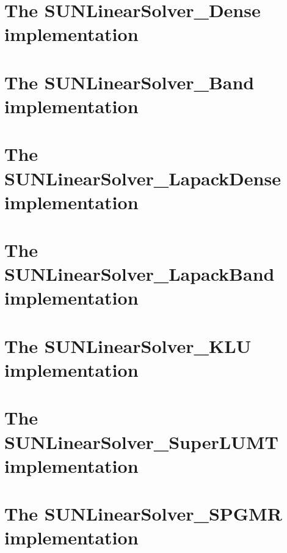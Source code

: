 \section{The SUNLinearSolver\_Dense implementation}\label{ss:sunlinsol_dense}


\section{The SUNLinearSolver\_Band implementation}\label{ss:sunlinsol_band}


\section{The SUNLinearSolver\_LapackDense implementation}\label{ss:sunlinsol_lapdense}


\section{The SUNLinearSolver\_LapackBand implementation}\label{ss:sunlinsol_lapband}


\section{The SUNLinearSolver\_KLU implementation}\label{ss:sunlinsol_klu}


\section{The SUNLinearSolver\_SuperLUMT implementation}\label{ss:sunlinsol_superlumt}


\section{The SUNLinearSolver\_SPGMR implementation}\label{ss:sunlinsol_spgmr}


